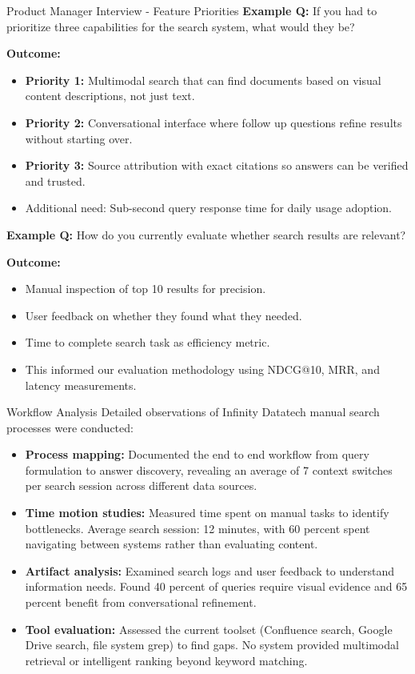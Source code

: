 \begin{frame}{Product Manager Interview - Feature Priorities}
\scriptsize
\textbf{Example Q:} If you had to prioritize three capabilities for the search system, what would they be?

\textbf{Outcome:}
\begin{itemize}
    \item \textbf{Priority 1:} Multimodal search that can find documents based on visual content descriptions, not just text.
    \item \textbf{Priority 2:} Conversational interface where follow up questions refine results without starting over.
    \item \textbf{Priority 3:} Source attribution with exact citations so answers can be verified and trusted.
    \item Additional need: Sub-second query response time for daily usage adoption.
\end{itemize}

\vspace{0.5em}
\textbf{Example Q:} How do you currently evaluate whether search results are relevant?

\textbf{Outcome:}
\begin{itemize}
    \item Manual inspection of top 10 results for precision.
    \item User feedback on whether they found what they needed.
    \item Time to complete search task as efficiency metric.
    \item This informed our evaluation methodology using NDCG@10, MRR, and latency measurements.
\end{itemize}
\end{frame}

\begin{frame}{Workflow Analysis}
Detailed observations of Infinity Datatech manual search processes were conducted:
\begin{itemize}
    \item \textbf{Process mapping:} Documented the end to end workflow from query formulation to answer discovery, revealing an average of 7 context switches per search session across different data sources.
    \item \textbf{Time motion studies:} Measured time spent on manual tasks to identify bottlenecks. Average search session: 12 minutes, with 60 percent spent navigating between systems rather than evaluating content.
    \item \textbf{Artifact analysis:} Examined search logs and user feedback to understand information needs. Found 40 percent of queries require visual evidence and 65 percent benefit from conversational refinement.
    \item \textbf{Tool evaluation:} Assessed the current toolset (Confluence search, Google Drive search, file system grep) to find gaps. No system provided multimodal retrieval or intelligent ranking beyond keyword matching.
\end{itemize}
\end{frame}

